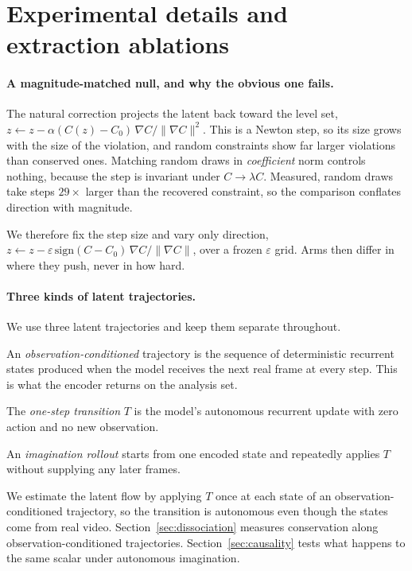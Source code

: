 \appendix

\section{Experimental details and extraction ablations}

\paragraph{A magnitude-matched null, and why the obvious one fails.}
The natural correction projects the latent back toward the level set,
$z \leftarrow z - \alpha (C(z) - C_0)\,\nabla C / \lVert \nabla C \rVert^2$. This is a Newton step, so
its size grows with the size of the violation, and random constraints show far larger violations
than conserved ones. Matching random draws in \emph{coefficient} norm controls nothing, because the step
is invariant under $C \to \lambda C$. Measured, random draws take steps $29\times$ larger than the
recovered constraint, so the comparison conflates direction with magnitude.

We therefore fix the step size and vary only direction,
$z \leftarrow z - \varepsilon\,\mathrm{sign}(C - C_0)\,\nabla C / \lVert \nabla C \rVert$, over a
frozen $\varepsilon$ grid. Arms then differ in where they push, never in how hard.

\paragraph{Three kinds of latent trajectories.} We use three latent trajectories and keep them
separate throughout.

An \emph{observation-conditioned} trajectory is the sequence of deterministic recurrent states
produced when the model receives the next real frame at every step. This is what the encoder returns
on the analysis set.

The \emph{one-step transition} $T$ is the model's autonomous recurrent update with zero action and
no new observation.

An \emph{imagination rollout} starts from one encoded state and repeatedly applies $T$ without
supplying any later frames.

We estimate the latent flow by applying $T$ once at each state of an observation-conditioned
trajectory, so the transition is autonomous even though the states come from real video.
Section~\ref{sec:dissociation} measures conservation along observation-conditioned trajectories.
Section~\ref{sec:causality} tests what happens to the same scalar under autonomous imagination.

